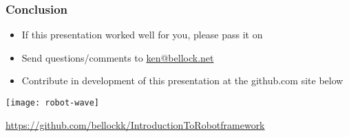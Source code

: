 \documentclass[xcolor=table,handout]{beamer}
\begin{document}
\begin{frame}\frametitle{Conclusion}
    \begin{itemize}
        \item If this presentation worked well for you, please pass it on
        \item Send questions/comments to \href{mailto:ken@bellock.net}{ken@bellock.net}
        \item Contribute in development of this presentation at the github.com site below
    \end{itemize}
    \begin{center}
    \texttt{[image: robot-wave]}

    \footnotesize\url{https://github.com/bellockk/IntroductionToRobotframework}
    \end{center}
\end{frame}
\end{document}
